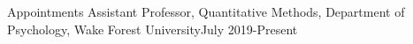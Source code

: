 \begin{rSection}{\textrm{Appointments}}
Assistant Professor, Quantitative Methods, Department of Psychology, Wake Forest University\hfill{July 2019-Present}
\end{rSection}
